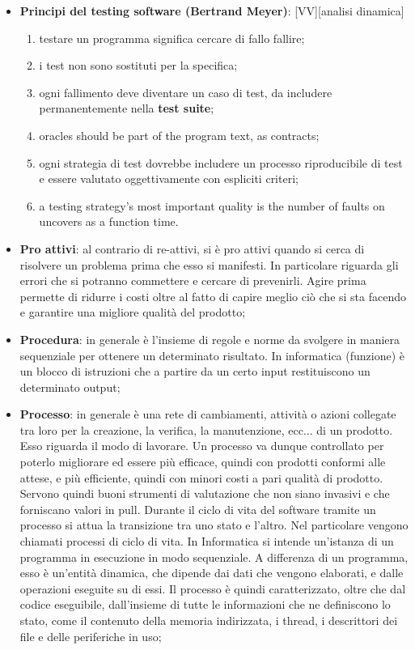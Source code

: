 \begin{itemize}
	\item \textbf{Principi del testing software (Bertrand Meyer)}: [VV][analisi dinamica]
		\begin{enumerate}
			\item testare un programma significa cercare di fallo fallire;
			\item i test non sono sostituti per la specifica;
			\item ogni fallimento deve diventare un caso di test, da includere permanentemente nella \textbf{test suite};
			\item oracles should be part of the program text, as contracts;
			\item ogni strategia di test dovrebbe includere un processo riproducibile di test e essere valutato oggettivamente con espliciti criteri;
			\item a testing strategy's most important quality is the number of faults on uncovers as a function time.
		\end{enumerate}

	\item \textbf{Pro attivi}: al contrario di re-attivi, si è pro attivi quando si cerca di risolvere un problema prima che esso si manifesti. In particolare riguarda gli errori che si potranno commettere e cercare di prevenirli. \newline
Agire prima permette di ridurre i costi oltre al fatto di capire meglio ciò che si sta facendo e garantire una migliore qualità del prodotto;

	\item \textbf{Procedura}: in generale è l'insieme di regole e norme da svolgere in maniera sequenziale per ottenere un determinato risultato. \newline
In informatica (funzione) è un blocco di istruzioni che a partire da un certo input restituiscono un determinato output;

	\item \textbf{Processo}:  in generale è una rete di cambiamenti, attività o azioni collegate tra loro per la creazione, la verifica, la manutenzione, ecc... di un prodotto. Esso riguarda il modo di lavorare. Un processo va dunque controllato per poterlo migliorare ed essere più efficace, quindi con prodotti conformi alle attese, e più efficiente, quindi con minori costi a pari qualità di prodotto. \newline
	Servono quindi buoni strumenti di valutazione che non siano invasivi e che forniscano valori in pull. \newline
	Durante il ciclo di vita del software tramite un processo si attua la transizione tra uno stato e l'altro. Nel particolare vengono chiamati processi di ciclo di vita. \newline
	In Informatica si intende un'istanza di un programma in esecuzione in modo sequenziale. A differenza di un programma, esso è un'entità dinamica, che dipende dai dati che vengono elaborati, e dalle operazioni eseguite su di essi. Il processo è quindi caratterizzato, oltre che dal codice eseguibile, dall'insieme di tutte le informazioni che ne definiscono lo stato, come il contenuto della memoria indirizzata, i thread, i descrittori dei file e delle periferiche in uso;


\end{itemize}
